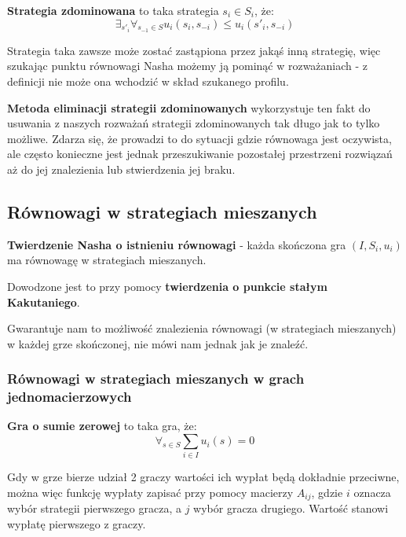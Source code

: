 \documentclass{standalone}
\begin{document}
\begin{definition}
\textbf{Strategia zdominowana} to taka strategia $s_i \in S_i$, że:
$$\exists_{s'_i} \forall_{s_{-1} \in S} u_i(s_i, s_{-i}) \leq u_i(s'_i, s_{-i})$$
\end{definition}

Strategia taka zawsze może zostać zastąpiona przez jakąś inną strategię, więc szukając punktu równowagi Nasha możemy ją
pominąć w rozważaniach - z definicji nie może ona wchodzić w skład szukanego profilu.

\textbf{Metoda eliminacji strategii zdominowanych} wykorzystuje ten fakt do usuwania z naszych rozważań strategii zdominowanych
tak długo jak to tylko możliwe. Zdarza się, że prowadzi to do sytuacji gdzie równowaga jest oczywista, ale często konieczne jest
jednak przeszukiwanie pozostałej przestrzeni rozwiązań aż do jej znalezienia lub stwierdzenia jej braku.

\subsection{Równowagi w strategiach mieszanych}

\begin{theorem}
\textbf{Twierdzenie Nasha o istnieniu równowagi} - każda skończona gra $(I, S_i, u_i)$ ma równowagę w strategiach mieszanych.
\end{theorem}

Dowodzone jest to przy pomocy \textbf{twierdzenia o punkcie stałym Kakutaniego}.

Gwarantuje nam to możliwość znalezienia równowagi (w strategiach mieszanych) w każdej grze skończonej, nie mówi nam jednak jak
je znaleźć.

\subsubsection{Równowagi w strategiach mieszanych w grach jednomacierzowych}

\begin{definition}
\textbf{Gra o sumie zerowej} to taka gra, że:
$$\forall_{s \in S} \sum_{i \in I} u_i(s) = 0$$
\end{definition}

Gdy w grze bierze udział 2 graczy wartości ich wypłat będą dokładnie przeciwne, można więc funkcję wypłaty zapisać przy pomocy
macierzy $A_{ij}$, gdzie $i$ oznacza wybór strategii pierwszego gracza, a $j$ wybór gracza drugiego. Wartość stanowi wypłatę
pierwszego z graczy.
\end{document}
